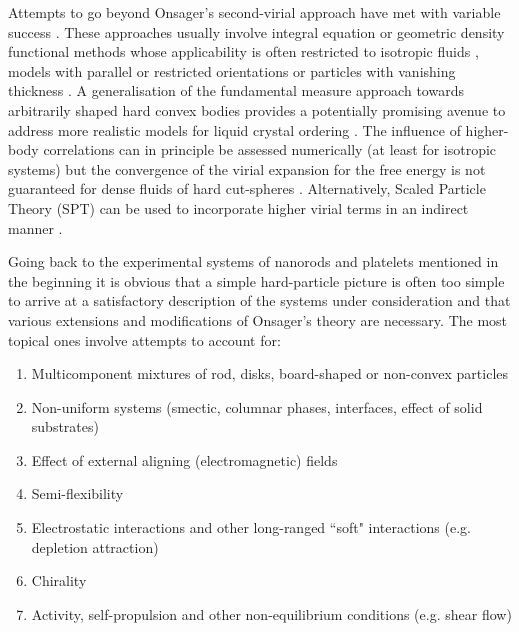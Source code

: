 \documentclass[amssymb]{revtex4}
\begin{document}
Attempts to go beyond Onsager's   second-virial approach have met with variable success \cite{harnau_mp2008}. These
approaches usually involve integral equation or geometric density
functional methods whose applicability is often restricted to isotropic
fluids \cite{costa_mp2005,cheung2008}, models with parallel or restricted
orientations \cite{harnaurowan} or particles with vanishing thickness
\cite{esztermann2006,harnaucosta}. A  generalisation of the fundamental
measure approach towards arbitrarily shaped hard convex bodies provides a
potentially promising avenue to address more realistic models for liquid
crystal ordering \cite{hansengoos_mecke2009}.  The influence of higher-body
correlations can in principle be assessed numerically \cite{masters2008}
(at least for isotropic systems) but the convergence of the virial
expansion for the free energy is not guaranteed for dense fluids of hard
cut-spheres \cite{you_jcp2005}. Alternatively, Scaled Particle Theory (SPT)
can be used to incorporate higher virial terms in an indirect manner \cite{savith}.

Going back to the experimental systems of nanorods and platelets mentioned in the beginning it is obvious that a simple hard-particle picture is often too simple to arrive at a satisfactory description of the systems under consideration and that various extensions and modifications of Onsager's theory are necessary.  The most topical ones involve attempts to  account for:
\vspace{0.3cm}
\begin{enumerate}
\setlength\itemsep{1em}
\item Multicomponent mixtures of rod, disks, board-shaped or non-convex particles
\item Non-uniform systems (smectic, columnar phases, interfaces, effect of solid substrates)
\item Effect of external aligning (electromagnetic) fields
\item Semi-flexibility 
\item Electrostatic interactions and other long-ranged ``soft" interactions (e.g. depletion attraction)
\item Chirality
\item Activity, self-propulsion and other non-equilibrium conditions (e.g. shear flow)
\end{enumerate}
\vspace{0.3cm}
\end{document}
